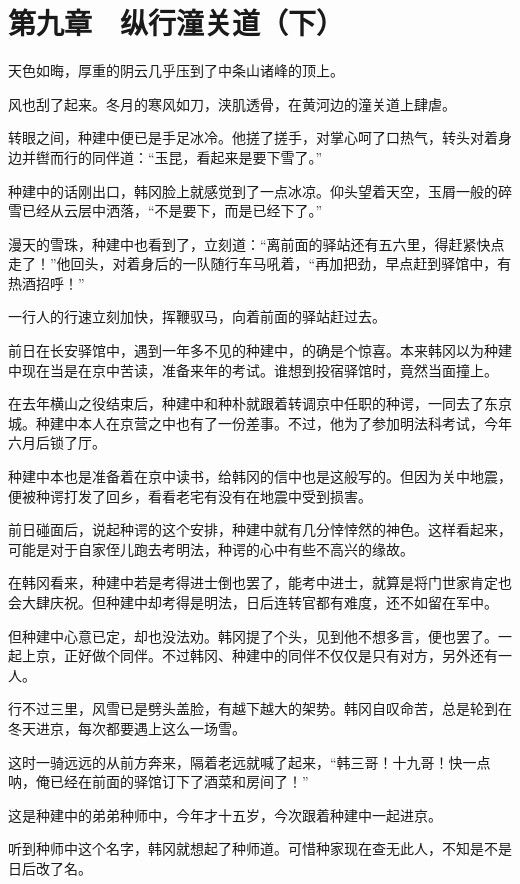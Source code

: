 \section{第九章　纵行潼关道（下）}

天色如晦，厚重的阴云几乎压到了中条山诸峰的顶上。

风也刮了起来。冬月的寒风如刀，浃肌透骨，在黄河边的潼关道上肆虐。

转眼之间，种建中便已是手足冰冷。他搓了搓手，对掌心呵了口热气，转头对着身边并辔而行的同伴道：“玉昆，看起来是要下雪了。”

种建中的话刚出口，韩冈脸上就感觉到了一点冰凉。仰头望着天空，玉屑一般的碎雪已经从云层中洒落，“不是要下，而是已经下了。”

漫天的雪珠，种建中也看到了，立刻道：“离前面的驿站还有五六里，得赶紧快点走了！”他回头，对着身后的一队随行车马吼着，“再加把劲，早点赶到驿馆中，有热酒招呼！”

一行人的行速立刻加快，挥鞭驭马，向着前面的驿站赶过去。

前日在长安驿馆中，遇到一年多不见的种建中，的确是个惊喜。本来韩冈以为种建中现在当是在京中苦读，准备来年的考试。谁想到投宿驿馆时，竟然当面撞上。

在去年横山之役结束后，种建中和种朴就跟着转调京中任职的种谔，一同去了东京城。种建中本人在京营之中也有了一份差事。不过，他为了参加明法科考试，今年六月后锁了厅。

种建中本也是准备着在京中读书，给韩冈的信中也是这般写的。但因为关中地震，便被种谔打发了回乡，看看老宅有没有在地震中受到损害。

前日碰面后，说起种谔的这个安排，种建中就有几分悻悻然的神色。这样看起来，可能是对于自家侄儿跑去考明法，种谔的心中有些不高兴的缘故。

在韩冈看来，种建中若是考得进士倒也罢了，能考中进士，就算是将门世家肯定也会大肆庆祝。但种建中却考得是明法，日后连转官都有难度，还不如留在军中。

但种建中心意已定，却也没法劝。韩冈提了个头，见到他不想多言，便也罢了。一起上京，正好做个同伴。不过韩冈、种建中的同伴不仅仅是只有对方，另外还有一人。

行不过三里，风雪已是劈头盖脸，有越下越大的架势。韩冈自叹命苦，总是轮到在冬天进京，每次都要遇上这么一场雪。

这时一骑远远的从前方奔来，隔着老远就喊了起来，“韩三哥！十九哥！快一点呐，俺已经在前面的驿馆订下了酒菜和房间了！”

这是种建中的弟弟种师中，今年才十五岁，今次跟着种建中一起进京。

听到种师中这个名字，韩冈就想起了种师道。可惜种家现在查无此人，不知是不是日后改了名。

